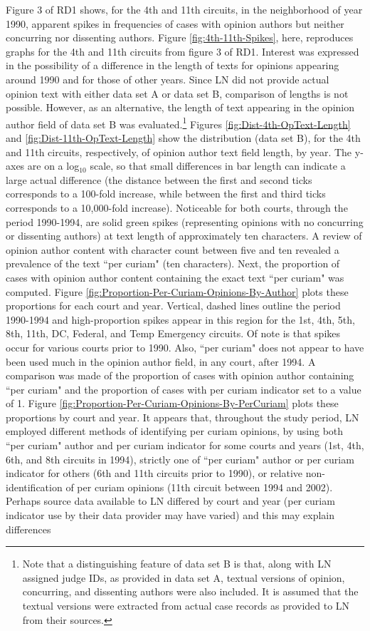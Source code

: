 \documentclass[10pt, letterpaper]{article}
\begin{document}
\begin{spacing}{1.0}
Figure 3 of RD1 shows, for the 4th and 11th circuits, in the neighborhood of year 1990, apparent spikes in frequencies of cases with opinion authors but neither concurring nor dissenting authors.  Figure \ref{fig:4th-11th-Spikes}, here, reproduces graphs for the 4th and 11th circuits from figure 3 of RD1.  Interest was expressed in the possibility of a difference in the length of texts for opinions appearing around 1990 and for those of other years.  Since LN did not provide actual opinion text with either data set A or data set B, comparison of lengths is not possible.  However, as an alternative, the length of text appearing in the opinion author field of data set B was evaluated.\footnote{Note that a distinguishing feature of data set B is that, along with LN assigned judge IDs, as provided in data set A, textual versions of opinion, concurring, and dissenting authors were also included.  It is assumed that the textual versions were extracted from actual case records as provided to LN from their sources.}  Figures \ref{fig:Dist-4th-OpText-Length} and \ref{fig:Dist-11th-OpText-Length} show the distribution (data set B), for the 4th and 11th circuits, respectively, of opinion author text field length, by year.  The y-axes are on a log$_{10}$ scale, so that small differences in bar length can indicate a large actual difference (the distance between the first and second ticks corresponds to a 100-fold increase, while between the first and third ticks corresponds to a 10,000-fold increase).  Noticeable for both courts, through the period 1990-1994, are solid green spikes (representing opinions with no concurring or dissenting authors) at text length of approximately ten characters.  A review of opinion author content with character count between five and ten revealed a prevalence of the text ``per curiam" (ten characters).  Next, the proportion of cases with opinion author content containing the exact text ``per curiam" was computed.  Figure \ref {fig:Proportion-Per-Curiam-Opinions-By-Author} plots these proportions for each court and year.  Vertical, dashed lines outline the period 1990-1994 and high-proportion spikes appear in this region for the 1st, 4th, 5th, 8th, 11th, DC, Federal, and Temp Emergency circuits.  Of note is that spikes occur for various courts prior to 1990.  Also, ``per curiam" does not appear to have been used much in the opinion author field, in any court, after 1994.  A comparison was made of the proportion of cases with opinion author containing ``per curiam" and the proportion of cases with per curiam indicator set to a value of 1.  Figure \ref{fig:Proportion-Per-Curiam-Opinions-By-PerCuriam} plots these proportions by court and year.  It appears that, throughout the study period, LN employed different methods of identifying per curiam opinions, by using both ``per curiam" author and per curiam indicator for some courts and years (1st, 4th, 6th, and 8th circuits in 1994), strictly one of ``per curiam" author or per curiam indicator for others (6th and 11th circuits prior to 1990), or relative non-identification of per curiam opinions (11th circuit between 1994 and 2002).  Perhaps source data available to LN differed by court and year (per curiam indicator use by their data provider may have varied) and this may explain differences 
\end{spacing}
\end{document}

